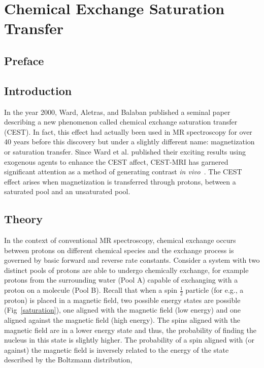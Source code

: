 
\chapter{Chemical Exchange Saturation Transfer}
\label{ch:CEST}

\section{Preface}

\section{Introduction}

In the year 2000, Ward, Aletras, and Balaban published a seminal paper describing a new phenomenon called chemical exchange saturation transfer (CEST).
In fact, this effect had actually been used in MR spectroscopy for over 40 years before this discovery but under a slightly different name: magnetization or saturation transfer.
Since Ward et al. published their exciting results using exogenous agents to enhance the CEST affect, CEST-MRI has garnered significant attention as a method of generating contrast \emph{in vivo}~\cite{Sherry:2008jg}.
The CEST effect arises when magnetization is transferred through protons, between a saturated pool and an unsaturated pool.

\section{Theory}

In the context of conventional MR spectroscopy, chemical exchange occurs between protons on different chemical species and the exchange process is governed by basic forward and reverse rate constants.
Consider a system with two distinct pools of protons are able to undergo chemically exchange, for example protons from the surrounding water (Pool A) capable of exchanging with a proton on a molecule (Pool B).
Recall that when a spin $\frac{1}{2}$ particle (for e.g., a proton) is placed in a magnetic field, two possible energy states are possible (Fig~\ref{saturation}), one aligned with the magnetic field (low energy) and one aligned against the magnetic field (high energy).
The spins aligned with the magnetic field are in a lower energy state and thus, the probability of finding the nucleus in this state is slightly higher.
The probability of a spin aligned with (or against) the magnetic field is inversely related to the energy of the  state described by the Boltzmann distribution,

